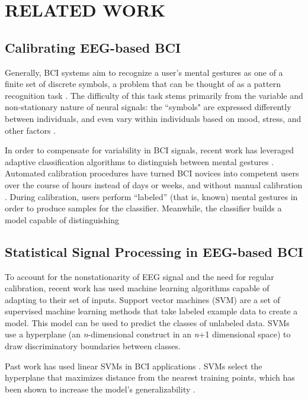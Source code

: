 \section{\uppercase{Related Work}}
\label{sec:related}

\subsection{Calibrating EEG-based BCI}

\noindent Generally, BCI systems aim to recognize a user's mental gestures as one of a finite set of discrete symbols, a problem that can be thought of as a pattern recognition task \cite{lotte_review_2007}. The difficulty of this task stems primarily from the variable and non-stationary nature of neural signals: the ``symbols" are expressed differently between individuals, and even vary within individuals based on mood, stress, and other factors \cite{vidaurre_machine-learning-based_2011}. 

In order to compensate for variability in BCI signals, recent work has leveraged adaptive classification algorithms to distinguish between mental gestures \cite{lotte_review_2007,vidaurre_machine-learning-based_2011,friedrich2013whatever}. Automated calibration procedures have turned BCI novices into competent users over the course of hours instead of days or weeks, and without manual calibration \cite{vidaurre_machine-learning-based_2011}. During calibration, users perform ``labeled'' (that is, known) mental gestures in order to produce samples for the classifier. Meanwhile, the classifier builds a model capable of distinguishing  

\subsection{Statistical Signal Processing in EEG-based BCI}

To account for the nonstationarity of EEG signal and the need for regular calibration, recent work has used machine learning algorithms capable of adapting to their set of inputs. Support vector machines (SVM) are a set of supervised machine learning methods that take labeled example data to create a model. This model can be used to predict the classes of unlabeled data. SVMs use a hyperplane (an \emph{n}-dimensional construct in an \emph{n}+1 dimensional space) to draw discriminatory boundaries between classes. 

Past work has used linear SVMs in BCI applications \cite{garrett_comparison_2003,grierson_better_2011}. SVMs select the hyperplane that maximizes distance from the nearest training points, which has been shown to increase the model's generalizability \cite{burges_tutorial_1998}. 

